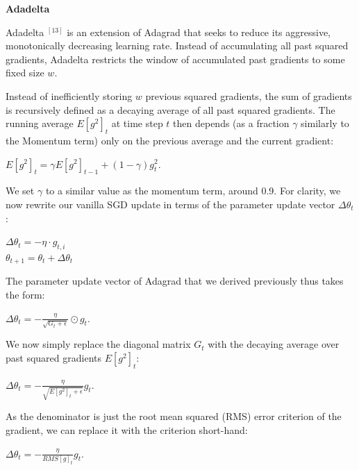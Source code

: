 \documentclass[4pt,journal,compsoc]{IEEEtran}
\begin{document}
\begin{flushleft}
    \textbf{\Large Adadelta} \newline
    
    Adadelta $^ {[13]}$ is an extension of Adagrad that seeks to reduce its aggressive, monotonically decreasing learning rate. Instead of accumulating all past squared gradients, Adadelta restricts the window of accumulated past gradients to some fixed size $w$. \newline
    
    Instead of inefficiently storing $w$ previous squared gradients, the sum of gradients is recursively defined as a decaying average of all past squared gradients. The running average $E[g^2]_t$ at time step $t$ then depends (as a fraction $\gamma$ similarly to the Momentum term) only on the previous average and the current gradient: \newline
    
    $E[g^2]_t = \gamma E[g^2]_{t-1} + (1 - \gamma)g_t^2$. \newline
    
    We set $\gamma$ to a similar value as the momentum term, around 0.9. For clarity, we now rewrite our vanilla SGD update in terms of the parameter update vector $\Delta \theta_t$: \newline
    
    $\Delta \theta_t = - \eta \cdot g_{t, i}$ \\
    $\theta_{t + 1} = \theta_t + \Delta \theta_t $ \newline
    
    The parameter update vector of Adagrad that we derived previously thus takes the form: \newline
    
    $\Delta \theta_t = - \frac{\eta}{\sqrt{G_t + \epsilon}} \odot g_t$. \newline
    
    We now simply replace the diagonal matrix $G_t$ with the decaying average over past squared gradients $E[g^2]_t$: \newline
    
    $\Delta \theta_t = - \frac{\eta}{\sqrt{E[g^2]_t + \epsilon}} g_t$. \newline
    
    As the denominator is just the root mean squared (RMS) error criterion of the gradient, we can replace it with the criterion short-hand: \newline
    
    $\Delta \theta_t = - \frac{\eta}{RMS[g]_t} g_t$. \newline
    

\end{flushleft}
\end{document}
